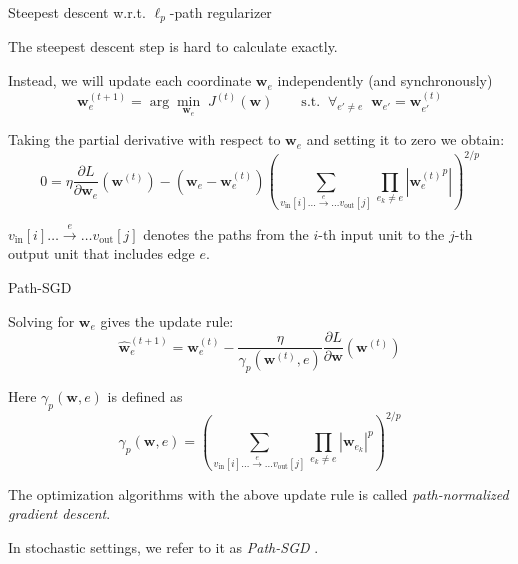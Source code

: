 \documentclass[presentation,xcolor={usenames,dvipsnames},10pt]{beamer}
\newcommand{\RSGD}{Path-SGD }
\begin{document}
\begin{frame}{Steepest descent w.r.t. $\ell_p$-path regularizer}
\bit 
\item The steepest descent step is hard to calculate exactly.  

\item Instead, we will update each coordinate $\textbf{w}_e$ independently (and synchronously)  
\begin{equation}
\textbf{w}_e^{(t+1)} =\arg\min_{\textbf{w}_e} \;J^{(t)}(\textbf{w}) \qquad \text{s.t.}\;\;\forall_{e'\neq e} \;\; \textbf{w}_{e'}=\textbf{w}^{(t)}_{e'}
\end{equation}

\item Taking the partial derivative with respect to $\textbf{w}_e$ and setting it to zero we obtain:
\begin{equation*}
0 =\eta \frac{\partial L}{\partial \textbf{w}_e}(\textbf{w}^{(t)}) - \left(\textbf{w}_e-\textbf{w}^{(t)}_e\right) 
\left(\sum_{v_{\text{in}}[i] \dots \stackrel{e}{\rightarrow} \dots v_{\text{out}}[j]} \prod_{e_k\neq e} |{\textbf{w}^{(t)}_e}^p|\right)^{2/p}
\end{equation*}
\item $v_{\text{in}}[i] \dots \stackrel{e}{\rightarrow} \dots v_{\text{out}}[j]$ denotes the paths from the  $i$-th input unit to the $j$-th output unit that includes edge $e$. 
\eit 
\end{frame}

\begin{frame}{Path-SGD}
\bit 
\item Solving for $\textbf{w}_e$ gives the update rule:
\begin{equation*}
\hat{\textbf{w}}^{(t+1)}_e = \textbf{w}^{(t)}_e- \frac{\eta}{\gamma_p(\textbf{w}^{(t)},e)}\frac{\partial L}{\partial \textbf{w}}(\textbf{w}^{(t)})
\end{equation*}

\item Here $\gamma_p(\textbf{w},e)$ is defined as 
\begin{equation*}
\gamma_p(\textbf{w},e) =\left(\sum_{v_{\text{in}}[i] \dots \stackrel{e}{\rightarrow} \dots v_{\text{out}}[j]} \prod_{e_k\neq e} |{\textbf{w}_{e_k}}|^p\right)^{2/p}
\end{equation*}

\item The optimization algorithms with the above update rule is called \emph{path-normalized gradient descent}. 

\item In stochastic settings, we refer to it as \emph{\RSGD}.
\eit 
\end{frame}
\end{document}
